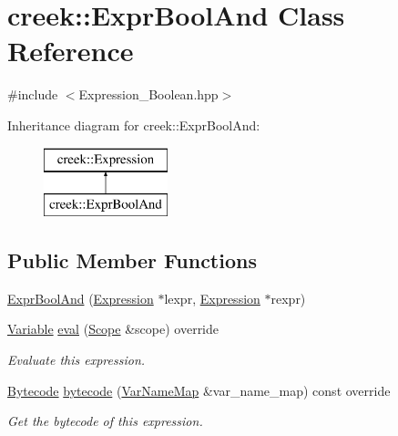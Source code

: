 \hypertarget{classcreek_1_1_expr_bool_and}{}\section{creek\+:\+:Expr\+Bool\+And Class Reference}
\label{classcreek_1_1_expr_bool_and}


{\ttfamily \#include $<$Expression\+\_\+\+Boolean.\+hpp$>$}

Inheritance diagram for creek\+:\+:Expr\+Bool\+And\+:\begin{figure}[H]
\begin{center}
\leavevmode
\includegraphics[height=2.000000cm]{classcreek_1_1_expr_bool_and}
\end{center}
\end{figure}
\subsection*{Public Member Functions}
\begin{DoxyCompactItemize}
\item 
\hyperlink{classcreek_1_1_expr_bool_and_a5dbf7e33af87caf5427ab44da1ca88fd}{Expr\+Bool\+And} (\hyperlink{classcreek_1_1_expression}{Expression} $\ast$lexpr, \hyperlink{classcreek_1_1_expression}{Expression} $\ast$rexpr)
\item 
\hyperlink{classcreek_1_1_variable}{Variable} \hyperlink{classcreek_1_1_expr_bool_and_a10e710637b3ab561e83c420a858a6130}{eval} (\hyperlink{classcreek_1_1_scope}{Scope} \&scope) override
\begin{DoxyCompactList}\small\item\em Evaluate this expression. \end{DoxyCompactList}\item 
\hyperlink{classcreek_1_1_bytecode}{Bytecode} \hyperlink{classcreek_1_1_expr_bool_and_aa7508bd2da67f5eee0e3d74d74e1f863}{bytecode} (\hyperlink{classcreek_1_1_var_name_map}{Var\+Name\+Map} \&var\+\_\+name\+\_\+map) const  override\hypertarget{classcreek_1_1_expr_bool_and_aa7508bd2da67f5eee0e3d74d74e1f863}{}\label{classcreek_1_1_expr_bool_and_aa7508bd2da67f5eee0e3d74d74e1f863}

\begin{DoxyCompactList}\small\item\em Get the bytecode of this expression. \end{DoxyCompactList}\end{DoxyCompactItemize}



